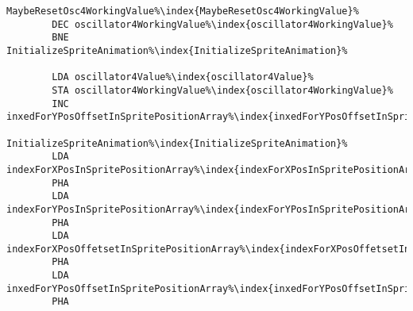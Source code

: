 \begin{minipage}[b]{0.45\linewidth}
\begin{lstlisting}[basicstyle=\tiny,caption=... and Iridis Alpha.,escapechar=\%]
MaybeResetOsc4WorkingValue%\index{MaybeResetOsc4WorkingValue}%   
        DEC oscillator4WorkingValue%\index{oscillator4WorkingValue}%
        BNE InitializeSpriteAnimation%\index{InitializeSpriteAnimation}%

        LDA oscillator4Value%\index{oscillator4Value}%
        STA oscillator4WorkingValue%\index{oscillator4WorkingValue}%
        INC inxedForYPosOffsetInSpritePositionArray%\index{inxedForYPosOffsetInSpritePositionArray}%

InitializeSpriteAnimation%\index{InitializeSpriteAnimation}%   
        LDA indexForXPosInSpritePositionArray%\index{indexForXPosInSpritePositionArray}%
        PHA
        LDA indexForYPosInSpritePositionArray%\index{indexForYPosInSpritePositionArray}%
        PHA
        LDA indexForXPosOffetsetInSpritePositionArray%\index{indexForXPosOffetsetInSpritePositionArray}%
        PHA
        LDA inxedForYPosOffsetInSpritePositionArray%\index{inxedForYPosOffsetInSpritePositionArray}%
        PHA
\end{lstlisting}
\end{minipage}
\clearpage
